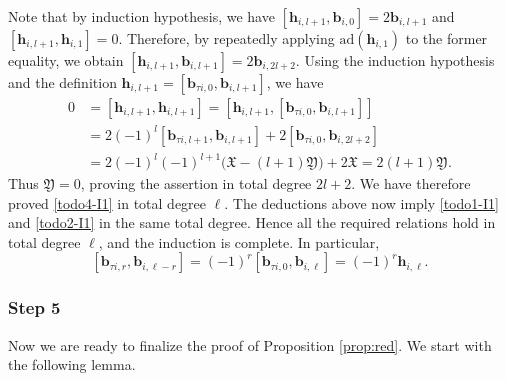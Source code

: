 \documentclass[11pt,reqno]{amsart}
\numberwithin{equation}{section}
\theoremstyle{definition}
\theoremstyle{remark}
\newcommand{\bb}{\mathbf{b}}
\newcommand{\bh}{\mathbf{h}}
\begin{document}
Note that by induction hypothesis, we have $[\bh_{i,l+1},\bb_{i,0}]=2\bb_{i,l+1}$ and $[\bh_{i,l+1},\bh_{i,1}]=0$. Therefore, by repeatedly applying $\mathrm{ad}(\bh_{i,1})$ to the former equality, we obtain $[\bh_{i,l+1},\bb_{i,l+1}]=2\bb_{i,2l+2}$. Using the induction hypothesis and the definition
$\bh_{i,l+1}=[\bb_{\tau i,0},\bb_{i,l+1}]$, we have
\begin{align*}
0
&=[\bh_{i,l+1},\bh_{i,l+1}]
 =[\bh_{i,l+1},[\bb_{\tau i,0},\bb_{i,l+1}]]
\\
&=2(-1)^l[\bb_{\tau i,l+1},\bb_{i,l+1}]
  +2[\bb_{\tau i,0},\bb_{i,2l+2}]
\\
&=2(-1)^l(-1)^{l+1}
  \big(\mathfrak X-(l+1)\mathfrak Y\big)
  +2\mathfrak X=2(l+1)\mathfrak Y.
\end{align*}
Thus $\mathfrak Y=0$, proving the assertion in total degree $2l+2$. We have therefore proved \eqref{todo4-I1} in total degree $\ell$.
The deductions above now imply \eqref{todo1-I1} and
\eqref{todo2-I1} in the same total degree. Hence all the required
relations hold in total degree $\ell$, and the induction is complete.
In particular,
\[
[\bb_{\tau i,r},\bb_{i,\ell-r}]
=
(-1)^r[\bb_{\tau i,0},\bb_{i,\ell}]
=
(-1)^r\bh_{i,\ell}.
\]

\subsubsection*{\bf Step 5}
Now we are ready to finalize the proof of Proposition \ref{prop:red}. We start with the following lemma.
\end{document}
